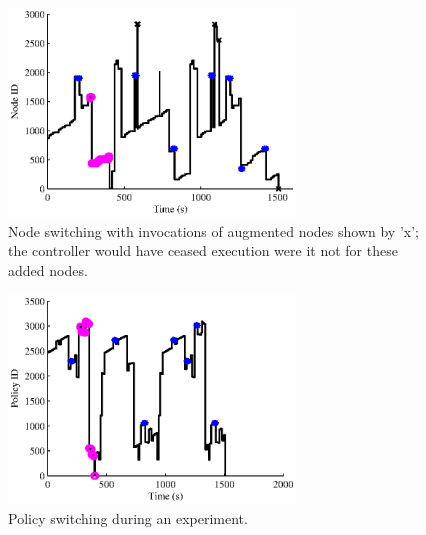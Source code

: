 \begin{figure}[bt]
  \centering 
   \includegraphics[width=3in]{graphics/AutRnd5_Run4_nodes.eps}

   \caption[`LAGR' node switching during experiment]{Node switching with
     invocations of augmented nodes shown by 'x'; the controller would have ceased
     execution were it not for these added nodes.}
   \label{fig:lagr_Aautomaton_experiments_nodes}
\end{figure}



\begin{figure}[bt]
  \centering 
  \includegraphics[width=3in]{graphics/AutRnd5_Run4_policies.eps}

   \caption[`LAGR' policy switching during experiment]{Policy switching during an experiment.}
   \label{fig:lagr_Aautomaton_experiments_policies}
\end{figure}

